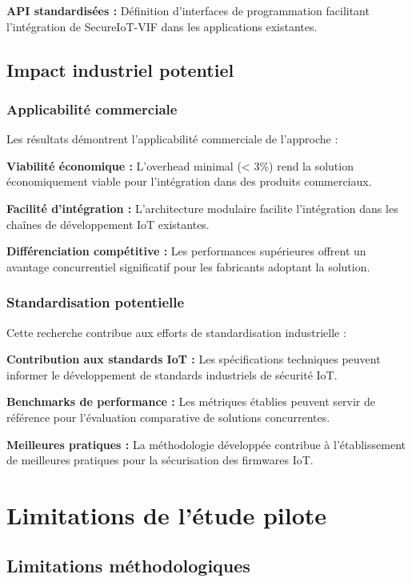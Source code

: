 \textbf{API standardisées :} Définition d'interfaces de programmation facilitant l'intégration de SecureIoT-VIF dans les applications existantes.

\subsection{Impact industriel potentiel}

\subsubsection{Applicabilité commerciale}

Les résultats démontrent l'applicabilité commerciale de l'approche :

\textbf{Viabilité économique :} L'overhead minimal (< 3\%) rend la solution économiquement viable pour l'intégration dans des produits commerciaux.

\textbf{Facilité d'intégration :} L'architecture modulaire facilite l'intégration dans les chaînes de développement IoT existantes.

\textbf{Différenciation compétitive :} Les performances supérieures offrent un avantage concurrentiel significatif pour les fabricants adoptant la solution.

\subsubsection{Standardisation potentielle}

Cette recherche contribue aux efforts de standardisation industrielle :

\textbf{Contribution aux standards IoT :} Les spécifications techniques peuvent informer le développement de standards industriels de sécurité IoT.

\textbf{Benchmarks de performance :} Les métriques établies peuvent servir de référence pour l'évaluation comparative de solutions concurrentes.

\textbf{Meilleures pratiques :} La méthodologie développée contribue à l'établissement de meilleures pratiques pour la sécurisation des firmwares IoT.

\section{Limitations de l'étude pilote}

\subsection{Limitations méthodologiques}

